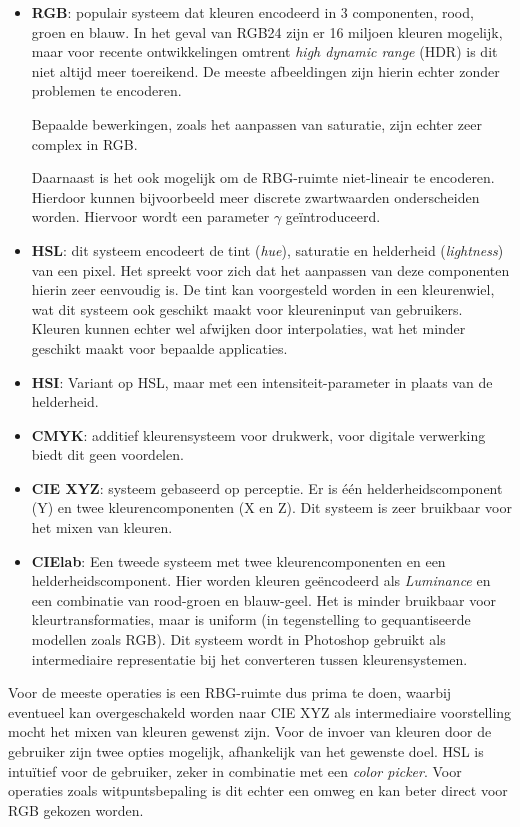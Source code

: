 \documentclass[twocolumn, a4paper]{article}
\begin{document}
\begin{itemize}
    \item \textbf{RGB}: populair systeem dat kleuren encodeerd in 3 componenten, rood, groen en blauw. In het geval van RGB24 zijn er 16 miljoen kleuren mogelijk, maar voor recente ontwikkelingen omtrent \emph{high dynamic range} (HDR) is dit niet altijd meer toereikend. De meeste afbeeldingen zijn hierin echter zonder problemen te encoderen. 

    Bepaalde bewerkingen, zoals het aanpassen van saturatie, zijn echter zeer complex in RGB. 

    Daarnaast is het ook mogelijk om de RBG-ruimte niet-lineair te encoderen. Hierdoor kunnen bijvoorbeeld meer discrete zwartwaarden onderscheiden worden. Hiervoor wordt een parameter $\gamma$ geïntroduceerd.
    
    \item \textbf{HSL}: dit systeem encodeert de tint (\emph{hue}), saturatie en helderheid (\emph{lightness}) van een pixel. Het spreekt voor zich dat het aanpassen van deze componenten hierin zeer eenvoudig is. De tint kan voorgesteld worden in een kleurenwiel, wat dit systeem ook geschikt maakt voor kleureninput van gebruikers. Kleuren kunnen echter wel afwijken door interpolaties, wat het minder geschikt maakt voor bepaalde applicaties.

    \item \textbf{HSI}: Variant op HSL, maar met een intensiteit-parameter in plaats van de helderheid.  
    \item \textbf{CMYK}: additief kleurensysteem voor drukwerk, voor digitale verwerking biedt dit geen voordelen. 
    \item \textbf{CIE XYZ}: systeem gebaseerd op perceptie. Er is één helderheidscomponent (Y) en twee kleurencomponenten (X en Z). Dit systeem is zeer bruikbaar voor het mixen van kleuren.
    \item \textbf{CIElab}: Een tweede systeem met twee kleurencomponenten en een helderheidscomponent. Hier worden kleuren geëncodeerd als \emph{Luminance} en een combinatie van rood-groen en blauw-geel. Het is minder bruikbaar voor kleurtransformaties, maar is uniform (in tegenstelling to gequantiseerde modellen zoals RGB). Dit systeem wordt in Photoshop gebruikt als intermediaire representatie bij het converteren tussen kleurensystemen.
\end{itemize}

Voor de meeste operaties is een RBG-ruimte dus prima te doen, waarbij eventueel kan overgeschakeld worden naar CIE XYZ als intermediaire voorstelling mocht het mixen van kleuren gewenst zijn. Voor de invoer van kleuren door de gebruiker zijn twee opties mogelijk, afhankelijk van het gewenste doel. HSL is intuïtief voor de gebruiker, zeker in combinatie met een \emph{color picker}. Voor operaties zoals witpuntsbepaling is dit echter een omweg en kan beter direct voor RGB gekozen worden. 
\end{document}
